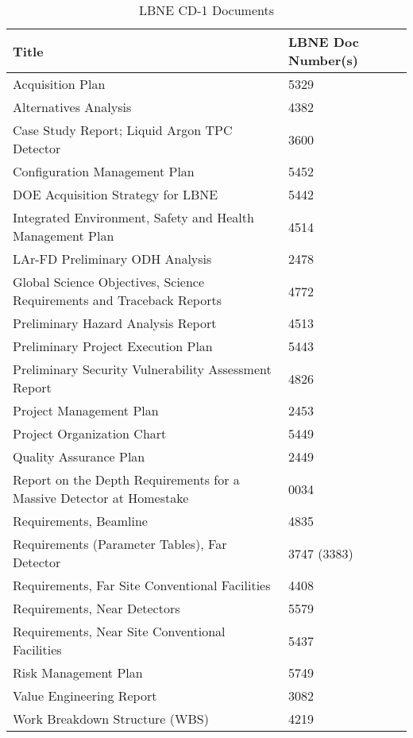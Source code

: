 \begin{center}
\begin{longtable}{|p{10cm}|p{4cm}|} %
\caption{LBNE CD-1 Documents}
\label{table:cd-1-doc-list} \\
   \multicolumn{1}{p{10cm}}{\textbf{Title}} & %
   \multicolumn{1}{p{4cm}}{\textbf{LBNE Doc Number(s)}} \\
\hline
\endfirsthead
Acquisition Plan & 5329 \\
\hline
Alternatives Analysis  & 4382    \\
\hline
Case Study Report; Liquid Argon TPC Detector &  3600   \\
\hline
Configuration Management Plan & 5452  \\
\hline
DOE Acquisition Strategy for LBNE & 5442 \\
\hline
Integrated Environment, Safety and Health Management Plan & 4514 \\
\hline
LAr-FD Preliminary ODH Analysis &  2478   \\
\hline
Global Science Objectives, Science Requirements and Traceback Reports &  4772   \\
\hline
Preliminary Hazard Analysis Report  &  4513  \\
\hline
Preliminary Project Execution Plan &   5443 \\
\hline
Preliminary Security Vulnerability Assessment Report & 4826 \\
\hline
Project Management Plan  & 2453    \\
\hline
Project Organization Chart & 5449    \\
\hline
Quality Assurance Plan & 2449    \\
\hline
Report on the Depth Requirements for a Massive Detector at Homestake & 0034  \\
\hline
Requirements, Beamline &  4835   \\
\hline
Requirements (Parameter Tables), Far Detector &  3747 (3383)\\
\hline
Requirements, Far Site Conventional Facilities  &   4408  \\
\hline
Requirements, Near Detectors & 5579 \\
\hline
Requirements, Near Site Conventional Facilities & 5437  \\
\hline
Risk Management Plan & 5749    \\
\hline
Value Engineering Report & 3082   \\
\hline
Work Breakdown Structure (WBS) & 4219    \\
\hline
\end{longtable}
\end{center}